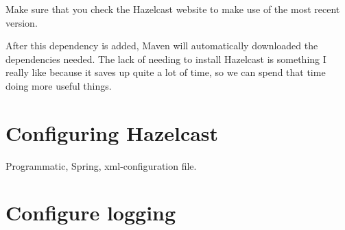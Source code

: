 Make sure that you check the Hazelcast website to make use of the most recent version. 

After this dependency is added, Maven will automatically downloaded the dependencies needed. The lack of needing to install Hazelcast is something I really like because it saves up quite a lot of time, so we can spend that time doing more useful things.

\section{Configuring Hazelcast}

Programmatic, Spring, xml-configuration file.

\section{}


\section{Configure logging}

